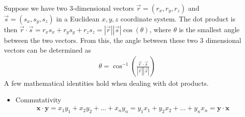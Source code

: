 Suppose we have two 3-dimensional vectors $\vec{r} = (r_x,r_y,r_z)$ and $\vec{s}=(s_x,s_y,s_z)$ in a Euclidean $x,y,z$ coordinate system. The dot product is then $\vec{r} \cdot \vec{s} = r_xs_x+r_ys_y+r_zs_z = |\vec{r}||\vec{s}|\cos(\theta)$, where $\theta$ is the smallest angle between the two vectors. From this, the angle between these two 3 dimensional vectors can be determined as 
\begin{align}
	\theta = \cos^{-1}\left(\frac{\vec{r} \cdot \vec{s}}{|\vec{r}||\vec{s}|}\right)
\end{align}
A few mathematical identities hold when dealing with dot products.

\begin{itemize}
	\item Commutativity
	\begin{align}
		\mathbf{x}\cdot\mathbf{y} = x_1y_1 + x_2y_2 + \hdots + x_ny_n = y_1x_1 + y_2x_2 + \hdots + y_nx_n = \mathbf{y}\cdot\mathbf{x}
	\end{align}
\end{itemize}
